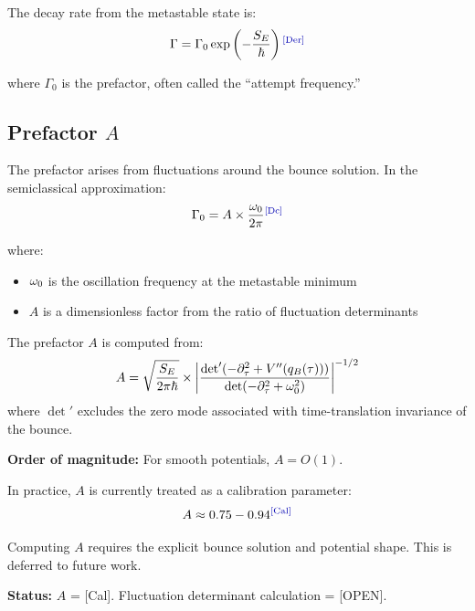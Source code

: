 The decay rate from the metastable state is:
\begin{equation}
    \Gamma = \Gamma_0 \exp\left(-\frac{\SE}{\hbar}\right)
    \label{eq:Gamma}
    \tagDer
\end{equation}

where $\Gamma_0$ is the prefactor, often called the ``attempt frequency.''

\subsection{Prefactor $A$}

The prefactor arises from fluctuations around the bounce solution. In the
semiclassical approximation:
\begin{equation}
    \Gamma_0 = A \times \frac{\omegaz}{2\pi}
    \label{eq:Gamma0}
    \tagDc
\end{equation}

where:
\begin{itemize}
    \item $\omega_0$ is the oscillation frequency at the metastable minimum
    \item $A$ is a dimensionless factor from the ratio of fluctuation determinants
\end{itemize}

\begin{derivationbox}[title=Prefactor Structure]
    The prefactor $A$ is computed from:
    \begin{equation}
        A = \sqrt{\frac{S_E}{2\pi\hbar}} \times
            \left| \frac{\det'(-\partial_\tau^2 + V''(q_B(\tau)))}
                        {\det(-\partial_\tau^2 + \omega_0^2)} \right|^{-1/2}
    \end{equation}
    where $\det'$ excludes the zero mode associated with time-translation
    invariance of the bounce.
    \tagDer
\end{derivationbox}

\textbf{Order of magnitude:} For smooth potentials, $A = O(1)$.

In practice, $A$ is currently treated as a calibration parameter:
\begin{equation}
    A \approx 0.75 - 0.94 \tagCal
\end{equation}

\begin{edcopenbox}[title=Open: Derive $A$ from fluctuation determinant]
    Computing $A$ requires the explicit bounce solution and potential shape.
    This is deferred to future work.

    \textbf{Status:} $A$ = [Cal]. Fluctuation determinant calculation = [OPEN].
    \tagOpen
\end{edcopenbox}

